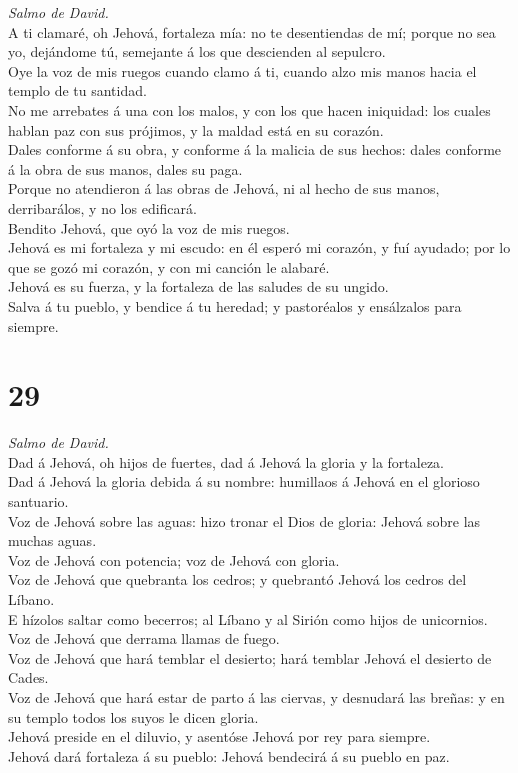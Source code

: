  \emph{Salmo de David.}\\
A ti clamaré, oh Jehová, fortaleza mía: no te desentiendas de mí; porque
no sea yo, dejándome tú, semejante á los que descienden al sepulcro.\\
 Oye la voz de mis ruegos cuando clamo á ti, cuando alzo mis
manos hacia el templo de tu santidad.\\
 No me arrebates á una con los malos, y con los que hacen
iniquidad: los cuales hablan paz con sus prójimos, y la maldad está en
su corazón.\\
 Dales conforme á su obra, y conforme á la malicia de sus
hechos: dales conforme á la obra de sus manos, dales su paga.\\
 Porque no atendieron á las obras de Jehová, ni al hecho de
sus manos, derribarálos, y no los edificará.\\
 Bendito Jehová, que oyó la voz de mis ruegos.\\
 Jehová es mi fortaleza y mi escudo: en él esperó mi
corazón, y fuí ayudado; por lo que se gozó mi corazón, y con mi canción
le alabaré.\\
 Jehová es su fuerza, y la fortaleza de las saludes de su
ungido.\\
 Salva á tu pueblo, y bendice á tu heredad; y pastoréalos y
ensálzalos para siempre.

\hypertarget{section-28}{%
\section{29}\label{section-28}}

 \emph{Salmo de David.}\\
Dad á Jehová, oh hijos de fuertes, dad á Jehová la gloria y la
fortaleza.\\
 Dad á Jehová la gloria debida á su nombre: humillaos á
Jehová en el glorioso santuario.\\
 Voz de Jehová sobre las aguas: hizo tronar el Dios de
gloria: Jehová sobre las muchas aguas.\\
 Voz de Jehová con potencia; voz de Jehová con gloria.\\
 Voz de Jehová que quebranta los cedros; y quebrantó Jehová
los cedros del Líbano.\\
 E hízolos saltar como becerros; al Líbano y al Sirión como
hijos de unicornios.\\
 Voz de Jehová que derrama llamas de fuego.\\
 Voz de Jehová que hará temblar el desierto; hará temblar
Jehová el desierto de Cades.\\
 Voz de Jehová que hará estar de parto á las ciervas, y
desnudará las breñas: y en su templo todos los suyos le dicen gloria.\\
 Jehová preside en el diluvio, y asentóse Jehová por rey
para siempre.\\
 Jehová dará fortaleza á su pueblo: Jehová bendecirá á su
pueblo en paz.

